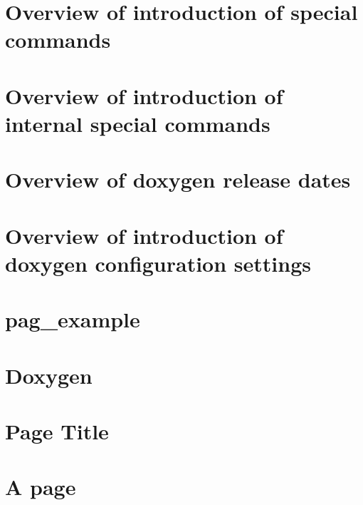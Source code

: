 \documentclass[twoside]{book}
\newcommand{\+}{\discretionary{\mbox{\scriptsize$\hookleftarrow$}}{}{}}
\begin{document}
\chapter{Overview of introduction of special commands}
\label{md_doxygen_build_doxygen_doc_internal_commands_history}

\chapter{Overview of introduction of internal special commands}
\label{md_doxygen_build_doxygen_doc_internal_commands_internal}

\chapter{Overview of doxygen release dates}
\label{md_doxygen_build_doxygen_doc_internal_releases}

\chapter{Overview of introduction of doxygen configuration settings}
\label{md_doxygen_build_doxygen_doc_internal_tags_history}

\chapter{pag\+\_\+example}
\label{pag_example}

\chapter{Doxygen}
\label{md_doxygen_build_doxygen__r_e_a_d_m_e}

\chapter{Page Title}
\label{mypage}

\chapter{A page}
\label{item2}

\end{document}
